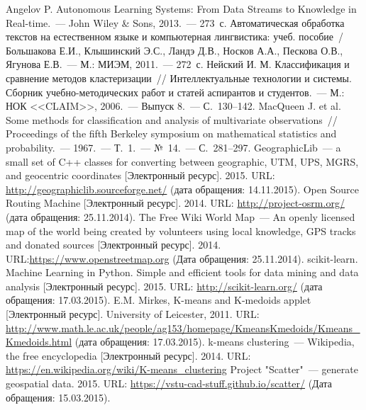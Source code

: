 \begin{thebibliography}{99}
     Angelov P. Autonomous Learning Systems: From Data Streams to Knowledge in Real-time.~--- John Wiley \& Sons, 2013.~--- 273~с.
     Автоматическая обработка текстов на естественном языке и компьютерная лингвистика: учеб. пособие~/ Большакова Е.И., Клышинский Э.С., Ландэ Д.В.,
Носков А.А., Пескова О.В., Ягунова Е.В.~--- М.: МИЭМ, 2011.~--- 272~с.
     Нейский И. М. Классификация и сравнение методов кластеризации~// Интеллектуальные технологии и системы. Сборник учебно-методических работ и статей аспирантов и студентов.~--- М.: НОК <<CLAIM>>, 2006.~--- Выпуск 8.~--- С.~130--142.
     MacQueen J. et al. Some methods for classification and analysis of multivariate observations~// Proceedings of the fifth Berkeley symposium on mathematical statistics and probability.~--- 1967.~--- Т.~1.~--- №~14.~--- С.~281--297.
     GeographicLib~--- a small set of C++ classes for converting between geographic, UTM, UPS, MGRS, and geocentric coordinates [Электронный ресурс]. 2015. URL: \url{http://geographiclib.sourceforge.net/} (дата обращения: 14.11.2015).
     Open Source Routing Machine [Электронный ресурс]. 2014. URL: \url{http://project-osrm.org/} (дата обращения: 25.11.2014).
     The Free Wiki World Map~--- An openly licensed map of the world being created by volunteers using local knowledge, GPS tracks and donated sources [Электронный ресурс]. 2014. URL:\url{https://www.openstreetmap.org} (Дата обращения: 25.11.2014).
     scikit-learn. Machine Learning in Python. Simple and efficient tools for data mining and data analysis [Электронный ресурс]. 2015. URL: \url{http://scikit-learn.org/} (дата обращения: 17.03.2015).
     E.M. Mirkes, K-means and K-medoids applet [Электронный ресурс]. University of Leicester, 2011. URL: \url{http://www.math.le.ac.uk/people/ag153/homepage/KmeansKmedoids/Kmeans_Kmedoids.html} (дата обращения: 17.03.2015).
     k-means clustering~--- Wikipedia, the free encyclopedia [Электронный ресурс]. 2014. URL: \url{https://en.wikipedia.org/wiki/K-means_clustering}
     Project "Scatter"~--- generate geospatial data. 2015. URL: \url{https://vstu-cad-stuff.github.io/scatter/} (Дата обращения: 15.03.2015).
        

\end{thebibliography}
